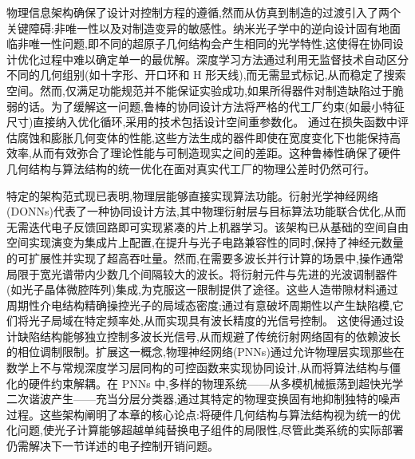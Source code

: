 物理信息架构确保了设计对控制方程的遵循,然而从仿真到制造的过渡引入了两个关键障碍:非唯一性以及对制造变异的敏感性。纳米光子学中的逆向设计固有地面临非唯一性问题,即不同的超原子几何结构会产生相同的光学特性,这使得在协同设计优化过程中难以确定单一的最优解。深度学习方法通过利用无监督技术自动区分不同的几何组别(如十字形、开口环和 H 形天线),而无需显式标记,从而稳定了搜索空间。然而,仅满足功能规范并不能保证实验成功,如果所得器件对制造缺陷过于脆弱的话。为了缓解这一问题,鲁棒的协同设计方法将严格的代工厂约束(如最小特征尺寸)直接纳入优化循环,采用的技术包括设计空间重参数化。\citep{doi_10_1021_acsphotonics_2c00313_0d7d39c3} 通过在损失函数中评估腐蚀和膨胀几何变体的性能,这些方法生成的器件即使在宽度变化下也能保持高效率,从而有效弥合了理论性能与可制造现实之间的差距。这种鲁棒性确保了硬件几何结构与算法结构的统一优化在面对真实代工厂的物理公差时仍然可行。\citep{doi_10_1515_nanoph_2019_0474_d2187501} \citep{doi_10_1021_acsphotonics_0c01202_d9ad1299} \citep{doi_10_1021_acsphotonics_2c00313_0d7d39c3}

特定的架构范式现已表明,物理层能够直接实现算法功能。衍射光学神经网络(DONNs)代表了一种协同设计方法,其中物理衍射层与目标算法功能联合优化,从而无需迭代电子反馈回路即可实现紧凑的片上机器学习。该架构已从基础的空间自由空间实现演变为集成片上配置,在提升与光子电路兼容性的同时,保持了神经元数量的可扩展性并实现了超高吞吐量。然而,在需要多波长并行计算的场景中,操作通常局限于宽光谱带内少数几个间隔较大的波长。将衍射元件与先进的光波调制器件(如光子晶体微腔阵列)集成,为克服这一限制提供了途径。这些人造带隙材料通过周期性介电结构精确操控光子的局域态密度;通过有意破坏周期性以产生缺陷模,它们将光子局域在特定频率处,从而实现具有波长精度的光信号控制。\citep{doi_10_1371_journal_pone_0341241_2b7bcccf} \citep{doi_10_1109_isset62871_2024_10779731_6ff2a9a8} 这使得通过设计缺陷结构能够独立控制多波长光信号,从而规避了传统衍射网络固有的依赖波长的相位调制限制。扩展这一概念,物理神经网络(PNNs)通过允许物理层实现那些在数学上不与常规深度学习层同构的可控函数来实现协同设计,从而将算法结构与僵化的硬件约束解耦。在 PNNs 中,多样的物理系统------从多模机械振荡到超快光学二次谐波产生------充当分层分类器,通过其特定的物理变换固有地抑制独特的噪声过程。这些架构阐明了本章的核心论点:将硬件几何结构与算法结构视为统一的优化问题,使光子计算能够超越单纯替换电子组件的局限性,尽管此类系统的实际部署仍需解决下一节详述的电子控制开销问题。\citep{doi_10_1002_nap2_70098_8d5f2f8a} \citep{doi_10_1038_s41586_021_04223_6_6158a5ea} \citep{doi_10_1515_nanoph_2025_0168_86a0f7aa}

